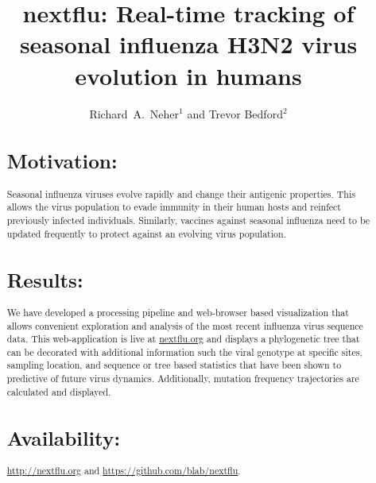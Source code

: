\documentclass{bioinfo}
\begin{document}
\title[Tracking of seasonal influenza H3N2 virus evolution]{nextflu: Real-time 
tracking of seasonal influenza H3N2 virus evolution in humans}
\author{Richard~A.~Neher$^{1}$ and Trevor Bedford$^{2}$}
\address{$^{1}$Max Planck Institute for Developmental Biology, 72076 T\"ubingen, 
Germany, and $^{2}$Vaccine and Infectious Disease Division, Fred Hutchinson
Cancer Research Center, Seattle, WA 98109, USA}


\maketitle



\begin{abstract} \section{Motivation:} Seasonal influenza viruses evolve
rapidly and change their antigenic properties. This allows the virus
population to evade immunity in their human hosts and reinfect previously
infected individuals. Similarly, vaccines against seasonal influenza need to
be updated frequently to protect against an evolving virus population.

\section{Results:} We have developed a processing pipeline and web-browser
based visualization that allows convenient exploration and analysis of the
most recent influenza virus sequence data. This web-application is live at
\url{nextflu.org} and displays a phylogenetic tree that can be decorated with
additional information such the viral genotype at specific
sites, sampling location, and sequence or tree based statistics that have been
shown to predictive of future virus dynamics. Additionally, mutation frequency
trajectories are calculated and displayed.

\section{Availability:} \url{http://nextflu.org} and \url{https://github.com/blab/nextflu}.
\end{abstract}
\end{document}
